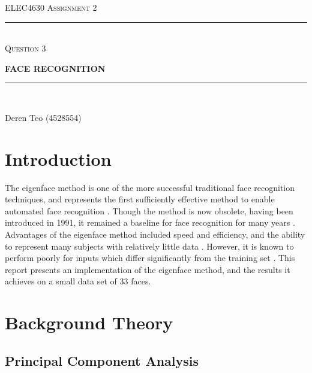 \begin{titlepage}
  \centering

  \textsc{ELEC4630 Assignment 2}\\
  \vspace{9cm}

  \rule{\linewidth}{0.5pt}\\

  \vspace{1em}
  \LARGE\textsc{Question 3}\\
  \vspace{1em}

  \LARGE\uppercase{\textbf{{Face Recognition}}}\\

  \rule{\linewidth}{2pt}\\

  \vfill

  \normalsize{Deren Teo (4528554)}
  \vspace{1cm}

\end{titlepage}

\section{Introduction}

The eigenface method is one of the more successful traditional face recognition techniques, and represents the first sufficiently effective method to enable automated face recognition \cite{rosebrock_2021}. Though the method is now obsolete, having been introduced in 1991, it remained a baseline for face recognition for many years \cite{elec4630_2023}. Advantages of the eigenface method included speed and efficiency, and the ability to represent many subjects with relatively little data \cite{turk_1991}. However, it is known to perform poorly for inputs which differ significantly from the training set \cite{turk_1991}. This report presents an implementation of the eigenface method, and the results it achieves on a small data set of 33 faces.

\section{Background Theory}

\subsection{Principal Component Analysis}

